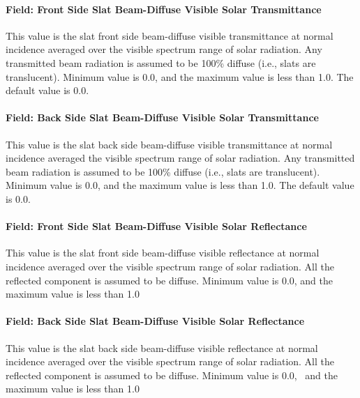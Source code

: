 \paragraph{Field: Front Side Slat Beam-Diffuse Visible Solar Transmittance}\label{field-front-side-slat-beam-diffuse-visible-solar-transmittance}

This value is the slat front side beam-diffuse visible transmittance at normal incidence averaged over the visible spectrum range of solar radiation. Any transmitted beam radiation is assumed to be 100\% diffuse (i.e., slats are translucent). Minimum value is 0.0, and the maximum value is less than 1.0. The default value is 0.0.

\paragraph{Field: Back Side Slat Beam-Diffuse Visible Solar Transmittance}\label{field-back-side-slat-beam-diffuse-visible-solar-transmittance}

This value is the slat back side beam-diffuse visible transmittance at normal incidence averaged the visible spectrum range of solar radiation. Any transmitted beam radiation is assumed to be 100\% diffuse (i.e., slats are translucent). Minimum value is 0.0, and the maximum value is less than 1.0. The default value is 0.0.

\paragraph{Field: Front Side Slat Beam-Diffuse Visible Solar Reflectance}\label{field-front-side-slat-beam-diffuse-visible-solar-reflectance}

This value is the slat front side beam-diffuse visible reflectance at normal incidence averaged over the visible spectrum range of solar radiation. All the reflected component is assumed to be diffuse. Minimum value is 0.0, and the maximum value is less than 1.0

\paragraph{Field: Back Side Slat Beam-Diffuse Visible Solar Reflectance}\label{field-back-side-slat-beam-diffuse-visible-solar-reflectance}

This value is the slat back side beam-diffuse visible reflectance at normal incidence averaged over the visible spectrum range of solar radiation. All the reflected component is assumed to be diffuse. Minimum value is 0.0,~ and the maximum value is less than 1.0

